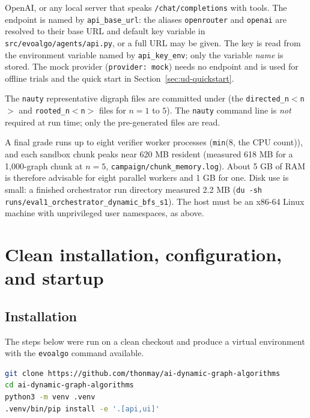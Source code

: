 \begin{description}
   OpenAI, or any local server that speaks \texttt{/chat/completions} with
   tools. The endpoint is named by \texttt{api\_base\_url}: the aliases
   \texttt{openrouter} and \texttt{openai} are resolved to their
   base URL and default key variable in \texttt{src/evoalgo/agents/api.py}, or a
   full URL may be given. The key is read from the environment variable named by
   \texttt{api\_key\_env}; only the variable \emph{name} is stored. The mock
   provider (\texttt{provider: mock}) needs no endpoint and is used for offline
   trials and the quick start in Section~\ref{sec:ud-quickstart}.
   \item[Graph data.] The \texttt{nauty} representative digraph files are
   committed under  (the
   \texttt{directed\_n$<$n$>$} and \texttt{rooted\_n$<$n$>$} files for $n = 1$
   to $5$). The \texttt{nauty} command line is \emph{not} required at run time;
   only the pre-generated files are read.
  \item[Hardware.] A final grade runs up to eight verifier worker processes
  (\texttt{min}(8, the CPU count)), and each sandbox chunk peaks near 620 MB
  resident (measured 618 MB for a 1,000-graph chunk at $n = 5$,
  \texttt{campaign/chunk\_memory.log}). About 5 GB of RAM is therefore
  advisable for eight parallel workers and 1 GB for one. Disk use is small: a
  finished orchestrator run directory measured 2.2 MB
  (\texttt{du -sh runs/eval1\_orchestrator\_dynamic\_bfs\_s1}). The host must be
  an x86-64 Linux machine with unprivileged user namespaces, as above.
\end{description}

\section{Clean installation, configuration, and startup}
\label{sec:ud-install}

\subsection{Installation}

The steps below were run on a clean checkout and produce a virtual environment
with the \texttt{evoalgo} command available.

\begin{lstlisting}[language=bash, basicstyle=\ttfamily\small]
git clone https://github.com/thonmay/ai-dynamic-graph-algorithms
cd ai-dynamic-graph-algorithms
python3 -m venv .venv
.venv/bin/pip install -e '.[api,ui]'
\end{lstlisting}

